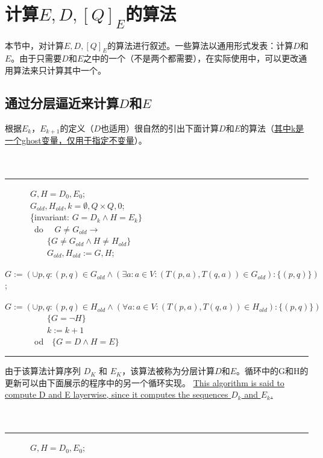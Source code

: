 
\section{计算$E,D,[Q]_E$的算法}
本节中，对计算$E,D,[Q]_E$的算法进行叙述。一些算法以通用形式发表：计算$D$和$E$。由于只需要$D$和$E$之中的一个（不是两个都需要），在实际使用中，可以更改通用算法来只计算其中一个。

\subsection{通过分层逼近来计算$D$和$E$}

根据$E_k$，$E_{k+1}$的定义（$D$也适用）很自然的引出下面计算$D$和$E$的算法（\uline{其中k是一个ghost变量，仅用于指定不变量}）。
\\
\\
\\
\rule{\textwidth}{1pt}
\mbox{　　　}$G,H=D_0,E_0$;\\
\mbox{　　　}$G_{old},H_{old},k=\emptyset ,Q \times Q,0$;\\
\mbox{　　　\{invariant:} $G=D_k \land H =E_k \}$\\
\mbox{　　　 do　} $G \not= G_{old} \longrightarrow$ \\
\mbox{　　　　　}$\{G \not= G_{old} \land H \not= H_{old} \}$ \\
\mbox{　　　　　}$G_{old},H_{old}:=G,H$;\\
\mbox{　　　　　}$G:=(\cup p,q:(p,q)\in G_{old}\land (\exists a:a \in V : (T(p,a),T(q,a))\in G_{old} ) : \{(p,q)\})$; \\
\mbox{　　　　　}$G:=(\cup p,q:(p,q)\in H_{old}\land (\forall a:a \in V : (T(p,a),T(q,a))\in H_{old} ) : \{(p,q)\})$ \\
\mbox{　　　　　}$\{G=\neg H\}$ \\
\mbox{　　　　　}$k:=k+1$ \\
\mbox{　　　 od　}$ \{ G=D \land H=E \}$ \\
\rule{\textwidth}{1pt}
由于该算法计算序列 $D_K$ 和 $E_K$，该算法被称为分层计算$D$和$E$。循环中的G和H的更新可以由下面展示的程序中的另一个循环实现。
\uline{This algorithm is said to compute D and E layerwise, since it computes the sequences $D_k$ and $E_k$.}
\\
\\
\\
\rule{\textwidth}{1pt}
\mbox{　　　}$G,H=D_0,E_0$;\\
